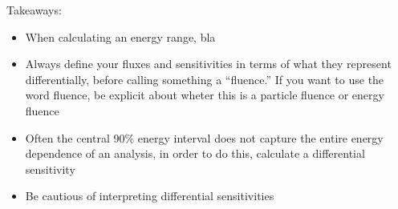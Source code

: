 \documentclass[a4paper,11pt]{article}
\begin{document}
Takeaways:
\begin{itemize}
    \item When calculating an energy range, bla
    \item Always define your fluxes and sensitivities in terms of what they represent differentially, before calling something a ``fluence.'' If you want to use the word fluence, be explicit about wheter this is a particle fluence or energy fluence
    \item Often the central 90\% energy interval does not capture the entire energy dependence of an analysis, in order to do this, calculate a differential sensitivity
    \item Be cautious of interpreting differential sensitivities
\end{itemize}



\end{document}
